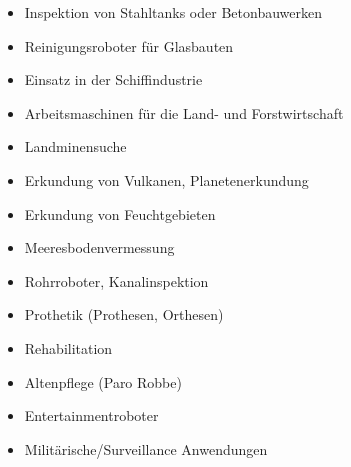 \begin{itemize}
	\item Inspektion von Stahltanks oder Betonbauwerken
	\item Reinigungsroboter für Glasbauten
	\item Einsatz in der Schiffindustrie
	\item Arbeitsmaschinen für die Land- und Forstwirtschaft
	\item Landminensuche
	\item Erkundung von Vulkanen, Planetenerkundung
	\item Erkundung von Feuchtgebieten
	\item Meeresbodenvermessung
	\item Rohrroboter, Kanalinspektion
	\item Prothetik (Prothesen, Orthesen)
	\item Rehabilitation
	\item Altenpflege (Paro Robbe)
	\item Entertainmentroboter
	\item Militärische/Surveillance Anwendungen
\end{itemize}
